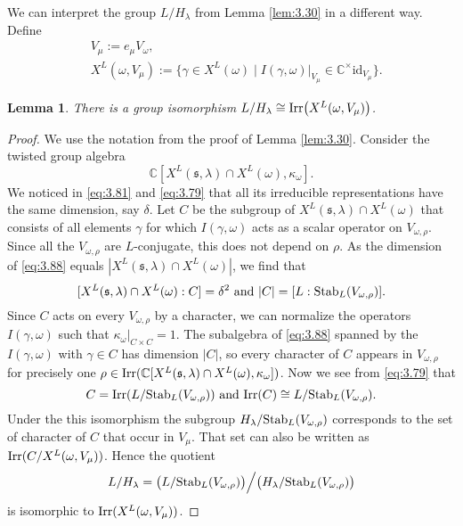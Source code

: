 \documentclass[11pt]{amsart}
\newtheorem{lem}[thm]{Lemma}
\theoremstyle{definition}
\begin{document}
We can interpret the group $L / H_\lambda$ from Lemma \ref{lem:3.30} in a different way. 
Define \label{i:60} \label{i:79}
\begin{equation}\label{eq:3.89}
\begin{aligned}
& V_{\mu } := e_{\mu } V_\omega , \\
& X^L (\omega, V_{\mu }) := \big\{ \gamma \in X^L (\omega) \mid 
I(\gamma,\omega) |_{V_{\mu }} \in {\mathbb C}^\times \mathrm{id}_{V_{\mu }} \big\} .
\end{aligned}
\end{equation}

\begin{lem}\label{lem:3.13}
There is a group isomorphism $L / H_\lambda \cong {{\rm Irr}} \big( X^L (\omega,V_\mu ) \big)$. 
\end{lem}
\begin{proof}
We use the notation from the proof of Lemma \ref{lem:3.30}. Consider the twisted 
group algebra 
\begin{equation}\label{eq:3.88}
{\mathbb C} [X^L ({{\mathfrak s}} ,\lambda) \cap X^L (\omega), \kappa_\omega].
\end{equation} 
We noticed in \eqref{eq:3.81} and \eqref{eq:3.79} that all its irreducible
representations have the same dimension, say $\delta$. Let $C$ be the subgroup of
$X^L ({{\mathfrak s}},\lambda) \cap X^L (\omega)$ that consists of all elements $\gamma$ for 
which $I(\gamma,\omega)$ acts as a scalar operator on $V_{\omega,\rho}$. Since all
the $V_{\omega,\rho}$ are $L$-conjugate, this does not depend on $\rho$. As the
dimension of \eqref{eq:3.88} equals $|X^L ({{\mathfrak s}} ,\lambda) \cap X^L (\omega)|$, we 
find that 
\[
[ X^L ({{\mathfrak s}} ,\lambda) \cap X^L (\omega) : C ] = \delta^2 
\text{ and } |C| = [ L : {{\rm Stab}}_L (V_{\omega,\rho}) ] .
\]
Since $C$ acts on every $V_{\omega,\rho}$ by a character, we can normalize the
operators $I(\gamma,\omega)$ such that $\kappa_\omega |_{C \times C} = 1$.
The subalgebra of \eqref{eq:3.88} spanned by the $I(\gamma,\omega)$ with
$\gamma \in C$ has dimension $|C|$, so every character of $C$ appears in 
$V_{\omega,\rho}$ for precisely one $\rho \in {{\rm Irr}} ({\mathbb C} [X^L ({{\mathfrak s}} ,\lambda) 
\cap X^L (\omega),\kappa_\omega])$. Now we see from \eqref{eq:3.79} that 
\[
C = {{\rm Irr}} (L / {{\rm Stab}}_L (V_{\omega,\rho})) \text{ and } 
{{\rm Irr}} (C) \cong L / {{\rm Stab}}_L (V_{\omega,\rho}) .
\]
Under the this isomorphism the subgroup $H_\lambda / {{\rm Stab}}_L (V_{\omega,\rho})$
corresponds to the set of character of $C$ that occur in $V_{\mu }$. That set 
can also be written as ${{\rm Irr}} (C / X^L (\omega,V_{\mu }))$. Hence the quotient 
\[
L / H_\lambda = \big( L / {{\rm Stab}}_L (V_{\omega,\rho}) \big) \Big/ 
\big( H_\lambda / {{\rm Stab}}_L (V_{\omega,\rho}) \big)  
\]
is isomorphic to ${{\rm Irr}} (X^L (\omega,V_{\mu }))$.
\end{proof}
 
\end{document}
